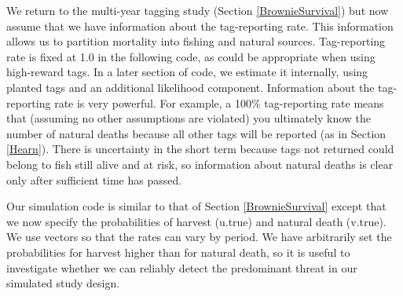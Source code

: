 \documentclass[
]{krantz}
\begin{document}
We return to the multi-year tagging study (Section \ref{BrownieSurvival}) but now assume that we have information about the tag-reporting rate. This information allows us to partition mortality into fishing and natural sources. Tag-reporting rate is fixed at 1.0 in the following code, as could be appropriate when using high-reward tags. In a later section of code, we estimate it internally, using planted tags \citep{hearn.etal2003} and an additional likelihood component. Information about the tag-reporting rate is very powerful. For example, a 100\% tag-reporting rate means that (assuming no other assumptions are violated) you ultimately know the number of natural deaths because all other tags will be reported (as in Section \ref{Hearn}). There is uncertainty in the short term because tags not returned could belong to fish still alive and at risk, so information about natural deaths is clear only after sufficient time has passed.

Our simulation code is similar to that of Section \ref{BrownieSurvival} except that we now specify the probabilities of harvest (u.true) and natural death (v.true). We use vectors so that the rates can vary by period. We have arbitrarily set the probabilities for harvest higher than for natural death, so it is useful to investigate whether we can reliably detect the predominant threat in our simulated study design.
\end{document}
